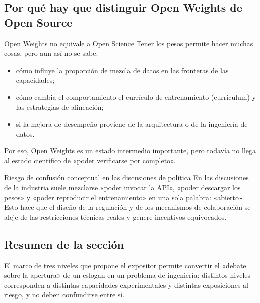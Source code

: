 \subsection{Por qué hay que distinguir Open Weights de Open Source}
\begin{knowledgebox}{Open Weights no equivale a Open Science}
Tener los pesos permite hacer muchas cosas, pero aun así no se sabe:
\begin{itemize}
    \item cómo influye la proporción de mezcla de datos en las fronteras de las capacidades;
    \item cómo cambia el comportamiento el currículo de entrenamiento (curriculum) y las estrategias de alineación;
    \item si la mejora de desempeño proviene de la arquitectura o de la ingeniería de datos.
\end{itemize}
Por eso, Open Weights es un estado intermedio importante, pero todavía no llega al estado científico de «poder verificarse por completo».
\end{knowledgebox}

\begin{warningbox}{Riesgo de confusión conceptual en las discusiones de política}
En las discusiones de la industria suele mezclarse «poder invocar la API», «poder descargar los pesos» y «poder reproducir el entrenamiento» en una sola palabra: «abierto». Esto hace que el diseño de la regulación y de los mecanismos de colaboración se aleje de las restricciones técnicas reales y genere incentivos equivocados.
\end{warningbox}

\subsection{Resumen de la sección}
El marco de tres niveles que propone el expositor permite convertir el «debate sobre la apertura» de un eslogan en un problema de ingeniería: distintos niveles corresponden a distintas capacidades experimentales y distintas exposiciones al riesgo, y no deben confundirse entre sí.

